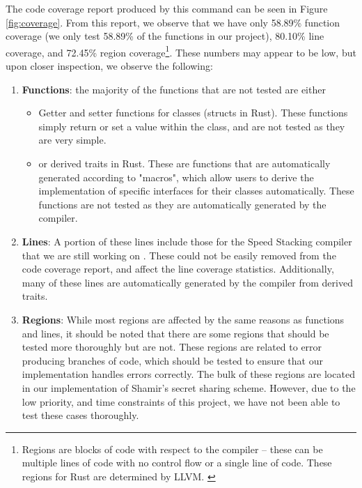 The code coverage report produced by this command can be seen in Figure \ref{fig:coverage}. From this report, we observe that we have only 58.89\% function 
coverage (we only test 58.89\% of the functions in our project), 80.10\% line 
coverage, and 72.45\% region coverage\footnote{Regions are blocks of code with 
respect to the compiler -- these can be multiple lines of code with no control flow 
or a single line of code. These regions for Rust are determined by LLVM. \cite{llvm-cov-explain}}. These numbers may appear to be low, but upon closer inspection,
we observe the following:
\begin{enumerate}
  \item \textbf{Functions}: the majority of the functions that are not tested are either
  \begin{itemize}
    \item Getter and setter functions for classes (structs in Rust). These functions 
    simply return or set a value within the class, and are not tested as they are very simple. 
    \item or derived traits \cite{rust-book-derived-traits} in Rust. These are functions that are automatically generated according to "macros", which allow users to derive the implementation of specific interfaces for their classes automatically. These functions are not tested as they are automatically generated by the compiler. 
  \end{itemize}
  \item \textbf{Lines}: A portion of these lines include those for the Speed Stacking 
  compiler that we are still working on \cite{SpeedStacking}. These could not be 
  easily removed from the code coverage report, and affect the line coverage statistics.
  Additionally, many of these lines are automatically generated by the compiler from 
  derived traits. 
  \item \textbf{Regions}: While most regions are affected by the same reasons as functions and lines, it should be noted that there are some regions that should be 
  tested more thoroughly but are not. These regions are related to error producing 
  branches of code, which should be tested to ensure that our implementation handles 
  errors correctly. The bulk of these regions are located in our implementation of 
  Shamir's secret sharing scheme. However, due to the low priority, and time constraints 
  of this project, we have not been able to test these cases thoroughly.
\end{enumerate}

